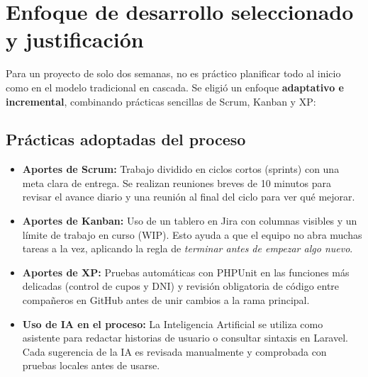 \section{Enfoque de desarrollo seleccionado y justificación}

Para un proyecto de solo dos semanas, no es práctico planificar todo al inicio como en el modelo tradicional en cascada. Se eligió un enfoque \textbf{adaptativo e incremental}, combinando prácticas sencillas de Scrum, Kanban y XP:

\subsection{Prácticas adoptadas del proceso}

\begin{itemize}[nosep]
    \item \textbf{Aportes de Scrum:} Trabajo dividido en ciclos cortos (sprints) con una meta clara de entrega. Se realizan reuniones breves de 10 minutos para revisar el avance diario y una reunión al final del ciclo para ver qué mejorar.
    \item \textbf{Aportes de Kanban:} Uso de un tablero en Jira con columnas visibles y un límite de trabajo en curso (WIP). Esto ayuda a que el equipo no abra muchas tareas a la vez, aplicando la regla de \textit{terminar antes de empezar algo nuevo}.
    \item \textbf{Aportes de XP:} Pruebas automáticas con PHPUnit en las funciones más delicadas (control de cupos y DNI) y revisión obligatoria de código entre compañeros en GitHub antes de unir cambios a la rama principal.
    \item \textbf{Uso de IA en el proceso:} La Inteligencia Artificial se utiliza como asistente para redactar historias de usuario o consultar sintaxis en Laravel. Cada sugerencia de la IA es revisada manualmente y comprobada con pruebas locales antes de usarse.
\end{itemize}
